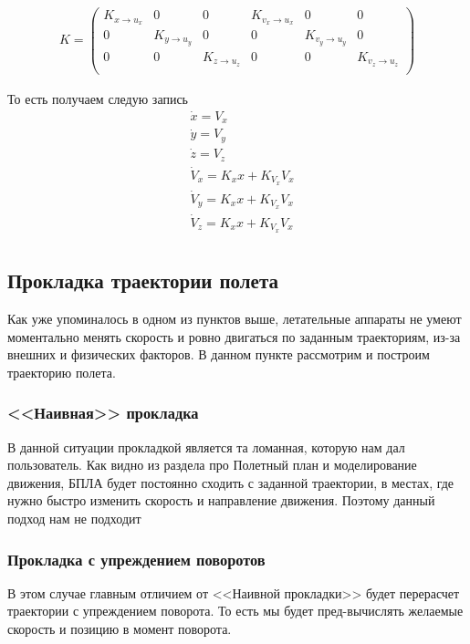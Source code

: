 \documentclass[a4paper,12pt]{article}
\begin{document}
\begin{align*}
K =
\begin{pmatrix}
    K_{x\rightarrow u_x}& 0& 0& K_{v_x\rightarrow u_x} & 0& 0\\
    0& K_{y\rightarrow u_y} & 0& 0& K_{v_y\rightarrow u_y} & 0\\
    0& 0& K_{z\rightarrow u_z} & 0& 0& K_{v_z\rightarrow u_z} \\
\end{pmatrix}
\end{align*}

То есть получаем следую запись
\begin{align*}
    &\dot{x} = V_x\\
    &\dot{y} = V_y\\
    &\dot{z} = V_z\\
    &\dot{V}_x = K_x x + K_{V_x} V_x\\
    &\dot{V}_y = K_x x + K_{V_x} V_x\\
    &\dot{V}_z = K_x x + K_{V_x} V_x\\
\end{align*}



\subsection{Прокладка траектории полета}
Как уже упоминалось в одном из пунктов выше, летательные аппараты не умеют моментально менять скорость и ровно двигаться по заданным траекториям, из-за внешних и физических факторов. В данном пункте рассмотрим и построим траекторию полета.

\subsubsection{<<Наивная>> прокладка}
В данной ситуации прокладкой является та ломанная, которую нам дал пользователь. Как видно из раздела про Полетный план и моделирование движения, БПЛА будет постоянно сходить с заданной траектории, в местах, где нужно быстро изменить скорость и направление движения. Поэтому данный подход нам не подходит


\subsubsection{Прокладка с упреждением поворотов}
В этом случае главным отличием от <<Наивной прокладки>> будет перерасчет траектории с упреждением поворота. То есть мы будет пред-вычислять желаемые скорость и позицию в момент поворота.
\end{document}
